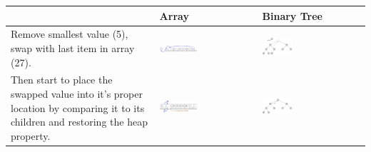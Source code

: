 \begin{center}
	\begin{table}
		\begin{tabular}{|p{}|M{0.4\textwidth}|M{0.30\textwidth}|}
			\hline
			  & Array & Binary Tree \\
			\hline
			\scriptsize{Remove smallest value (5), swap with last item in array (27).}
			&
			\includegraphics[width=0.40\textwidth]{images/3013_heap_percdown_1_array.png}&
			\includegraphics[width=0.30\textwidth]{images/3013_heap_percdown_1.png}\\
			\hline
			\scriptsize{Then start to place the swapped value into it's proper location by comparing it to its children and restoring the heap property.}
			& 
			\includegraphics[width=0.40\textwidth]{images/3013_heap_percdown_2_array.png}&
			\includegraphics[width=0.30\textwidth]{images/3013_heap_percdown_2.png}\\
			\hline
		\end{tabular}
		\label{tab:removemin1}
	\end{table}
\end{center}


